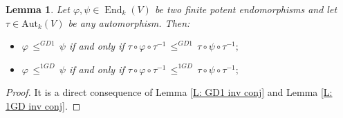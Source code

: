 \documentclass[10pt,a4paper]{amsart}
\newtheorem{lem}[defn]{Lemma}
\theoremstyle{plain}
\theoremstyle{remark}
\numberwithin{equation}{section} \numberwithin{defn}{section}
\newcommand\ed{\operatorname{End}}
\newcommand{\f}{\varphi}
\newcommand{\g}{\psi}
\begin{document}
\begin{lem}\label{L: GD1o 1GDo are inv}
Let $\f, \g \in \ed_k(V)$ be two finite potent endomorphisms and let $\tau \in \mathrm{Aut}_k(V)$ be any automorphism. Then: \begin{itemize}
\item $\f \, \leq^{GD1} \, \g$ if and only if $\tau \circ \f\circ \tau^{-1} \, \leq^{GD1} \, \tau \circ\g\circ \tau^{-1};$
\item $\f \, \leq^{1GD} \, \g$ if and only if $\tau \circ \f\circ \tau^{-1} \, \leq^{1GD} \, \tau \circ\g\circ \tau^{-1};$
\end{itemize}
\end{lem}
\begin{proof}
It is a direct consequence of Lemma \ref{L: GD1 inv conj} and Lemma \ref{L: 1GD inv conj}.
\end{proof}
\end{document}
